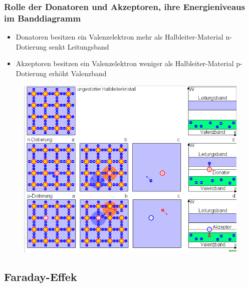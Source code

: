 \subsubsection*{Rolle der Donatoren und Akzeptoren, ihre Energieniveaus im Banddiagramm}
\begin{itemize}
    \item Donatoren besitzen ein Valenzelektron mehr als Halbleiter-Material
        \to n-Dotierung
        \to senkt Leitungsband
    \item Akzeptoren besitzen ein Valenzelektron weniger als Halbleiter-Material
        \to p-Dotierung 
        \to erhöht Valenzband
\end{itemize}
\begin{figure}[H]
    \centering
    \includegraphics[scale=0.5]{pictures/Dotierung.png}
\end{figure}

\subsection{Faraday-Effek}
